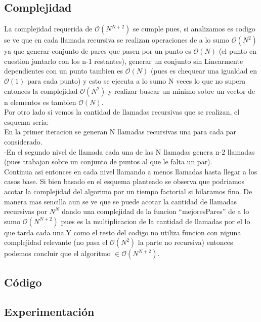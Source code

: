     \subsection{Complejidad}

    	La complejidad requerida de $\mathcal{O}(N^{N+2})$ se cumple pues, si analizamos es codigo se ve que en cada llamada recursiva se realizan operaciones de a lo sumo $\mathcal{O}(N^{2})$ ya que generar conjunto de pares que pasen por un punto es $\mathcal{O}(N)$ (el punto en cuestion juntarlo con los n-1 restantes), generar un conjunto sin Linearmente dependientes con un punto tambien es $\mathcal{O}(N)$ (pues es chequear una igualdad en  $\mathcal{O}(1)$ para cada punto) y esto se ejecuta a lo sumo N veces lo que no supera entonces la complejidad $\mathcal{O}(N^{2})$ y realizar buscar un minimo sobre un vector de n elementos es tambien $\mathcal{O}(N)$. \\
		Por otro lado si vemos la cantidad de llamadas recursivas que se realizan, el esquema seria:\\
		En la primer iteracion se generan N llamadas recursivas una para cada par considerado.\\
		-En el segundo nivel de llamada cada una de las N llamadas genera n-2 llamadas (pues trabajan sobre un conjunto de puntos al que le falta un par). \\ 
		Continua asi entonces en cada nivel llamando a menos llamadas hasta llegar a los casos base.
		Si bien basado en el esquema planteado se observa que podriamos acotar la complejidad del algorimo por un tiempo factorial si hilaramos fino. De manera mas sencilla aun se ve que se puede acotar la cantidad de llamadas recursivas por $N^{N}$ dando una complejidad de la funcion ``mejoresPares'' de a lo sumo $\mathcal{O}(N^{N+2})$ pues es la multiplicacion de la cantidad de llamadas por el lo que tarda cada una.Y como el resto del codigo no utiliza funcion con niguna complejidad relevante (no pasa el $\mathcal{O}(N^{2})$ la parte no recursiva) entonces podemos concluir que el algoritmo $ \in \mathcal{O}(N^{N+2})$.


    \subsection{Código}


    \subsection{Experimentación}